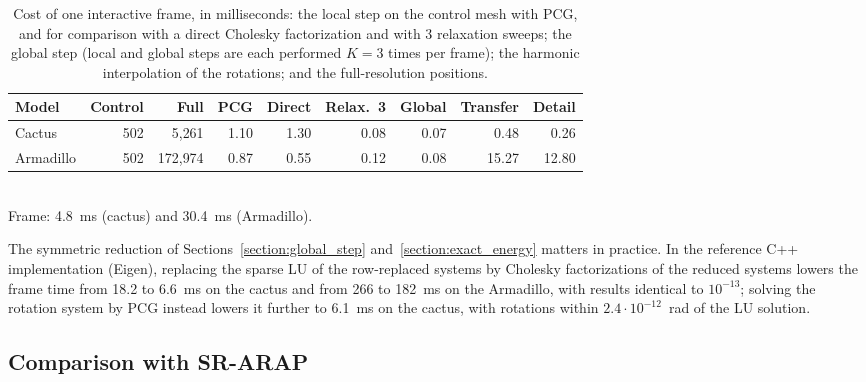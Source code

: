 \documentclass{birkjour}
\theoremstyle{remark}
\numberwithin{equation}{section}
\begin{document}
\begin{table}[t]
  \centering
  \caption{Cost of one interactive frame, in milliseconds: the local step on the control mesh with PCG, and for comparison with a direct Cholesky factorization and with 3 relaxation sweeps; the global step (local and global steps are each performed $K = 3$ times per frame); the harmonic interpolation of the rotations; and the full-resolution positions.}
  \label{tab:timing}
  {\small\setlength{\tabcolsep}{3pt}
  \begin{tabular}{lrrrrrrrr}
    \toprule
    Model & Control & Full & PCG & Direct & Relax.\ 3 & Global & Transfer & Detail \\
    \midrule
    Cactus    & 502 & 5{,}261   & 1.10 & 1.30 & 0.08 & 0.07 & 0.48  & 0.26  \\
    Armadillo & 502 & 172{,}974 & 0.87 & 0.55 & 0.12 & 0.08 & 15.27 & 12.80 \\
    \bottomrule
  \end{tabular}}\\[4pt]
  Frame: 4.8~ms (cactus) and 30.4~ms (Armadillo).
\end{table}

The symmetric reduction of Sections~\ref{section:global_step} and~\ref{section:exact_energy} matters in practice. In the reference C++ implementation (Eigen), replacing the sparse LU of the row-replaced systems by Cholesky factorizations of the reduced systems lowers the frame time from 18.2 to 6.6~ms on the cactus and from 266 to 182~ms on the Armadillo, with results identical to $10^{-13}$; solving the rotation system by PCG instead lowers it further to 6.1~ms on the cactus, with rotations within $2.4 \cdot 10^{-12}$~rad of the LU solution.

\subsection{Comparison with SR-ARAP}
\label{section:results_srarap}
\end{document}
